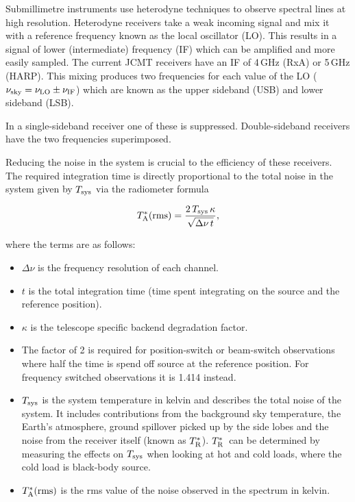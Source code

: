 \documentclass[11pt,oneside,chapters]{starlink}
\newcommand{\trs}{$T_{\textnormal{R}}^{*}$}
\begin{document}
Submillimetre instruments use heterodyne techniques to observe
spectral lines at high resolution. Heterodyne receivers take a weak
incoming signal and mix it with a reference frequency known as the
local oscillator (LO). This results in a signal of lower
(intermediate) frequency (IF) which can be amplified and more easily
sampled. The current JCMT receivers have an IF of 4\,GHz (RxA) or
5\,GHz (HARP). This mixing produces two frequencies for each value of
the LO ($\nu_{\textnormal{sky}} = \nu_{\textnormal{LO}}\pm\nu_{\textnormal{IF}}$) which are known as the
upper sideband (USB) and lower sideband (LSB).

In a single-sideband receiver one of these is suppressed. Double-sideband
receivers have the two frequencies superimposed.

Reducing the noise in the system is crucial to the efficiency of these
receivers. The required integration time is directly proportional to
the total noise in the system given by $T_{\textnormal{sys}}$ via the radiometer
formula

\[T_{\textnormal{A}}^*({\textnormal{rms}}) =
\frac{2\,T_{\textnormal{sys}}\,\kappa}{\sqrt{\Delta\nu\,t}},\]

where the terms are as follows:
\begin{itemize}
\item $\Delta\nu$ is the frequency resolution of each channel.

\item $t$ is the total integration time (time spent integrating on the
source and the reference position).

\item $\kappa$ is the telescope specific backend degradation factor.

\item The factor of 2 is required for position-switch or beam-switch
observations where half the time is spend off source at the reference
position. For frequency switched observations it is 1.414 instead.

\item $T_{\textnormal{sys}}$ is the system temperature in kelvin and
describes the total noise of the system. It includes contributions
from the background sky temperature, the Earth's atmosphere, ground
spillover picked up by the side lobes and the noise from the receiver
itself (known as \trs).  \trs\ can
be determined by measuring the effects on $T_{\textnormal{sys}}$ when
looking at hot and cold loads, where the cold load is black-body
source.

\item $T^*_{\textnormal{A}}({\textnormal{rms}})$ is the rms value of the noise observed
in the spectrum in kelvin.
\end{itemize}
\end{document}
